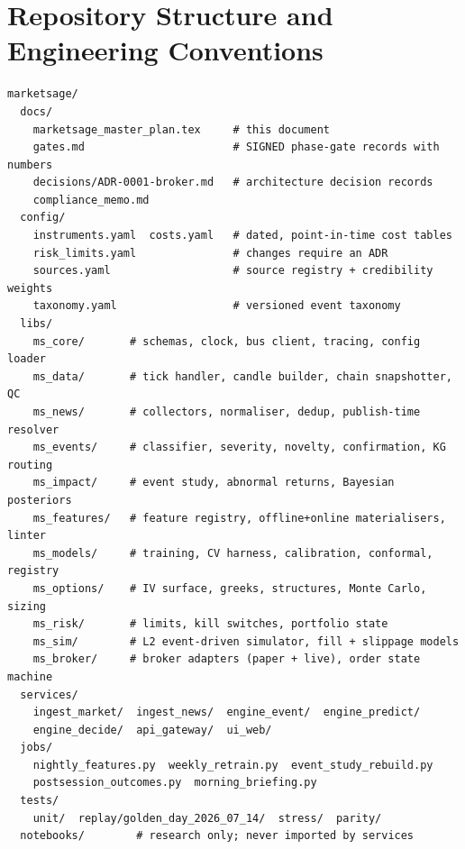 \chapter{Repository Structure and Engineering Conventions}
\label{ch:repo}

\begin{lstlisting}[caption={Monorepo layout}]
marketsage/
  docs/
    marketsage_master_plan.tex     # this document
    gates.md                       # SIGNED phase-gate records with numbers
    decisions/ADR-0001-broker.md   # architecture decision records
    compliance_memo.md
  config/
    instruments.yaml  costs.yaml   # dated, point-in-time cost tables
    risk_limits.yaml               # changes require an ADR
    sources.yaml                   # source registry + credibility weights
    taxonomy.yaml                  # versioned event taxonomy
  libs/
    ms_core/       # schemas, clock, bus client, tracing, config loader
    ms_data/       # tick handler, candle builder, chain snapshotter, QC
    ms_news/       # collectors, normaliser, dedup, publish-time resolver
    ms_events/     # classifier, severity, novelty, confirmation, KG routing
    ms_impact/     # event study, abnormal returns, Bayesian posteriors
    ms_features/   # feature registry, offline+online materialisers, linter
    ms_models/     # training, CV harness, calibration, conformal, registry
    ms_options/    # IV surface, greeks, structures, Monte Carlo, sizing
    ms_risk/       # limits, kill switches, portfolio state
    ms_sim/        # L2 event-driven simulator, fill + slippage models
    ms_broker/     # broker adapters (paper + live), order state machine
  services/
    ingest_market/  ingest_news/  engine_event/  engine_predict/
    engine_decide/  api_gateway/  ui_web/
  jobs/
    nightly_features.py  weekly_retrain.py  event_study_rebuild.py
    postsession_outcomes.py  morning_briefing.py
  tests/
    unit/  replay/golden_day_2026_07_14/  stress/  parity/
  notebooks/        # research only; never imported by services
\end{lstlisting}


